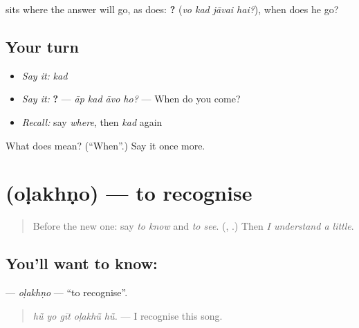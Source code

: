 \begin{grammarlens}[title={What you've built}]
\textbf{} sits where the answer will go, as \textbf{} does: \textbf{   ?} (\emph{vo kad jāvai hai?}), when does he go?
\end{grammarlens}

\subsection*{Your turn}
\begin{itemize}
\raggedright
  \item \emph{Say it:} \emph{kad}
  \item \emph{Say it:} \textbf{   ?} — \emph{āp kad āvo ho?} — When do you come?
  \item \emph{Recall:} say \emph{where}, then \emph{kad} again
\end{itemize}

\begin{tcolorbox}[breakable,colback=teal!4,colframe=teal!35!black,title={Before you move on}]
What does \textbf{} mean? (\textquotedblleft{}When\textquotedblright{}.) Say it once more.
\end{tcolorbox}
\section[\texorpdfstring{\mw{ओळखणो} (oḷakhṇo)}{ओळखणो (oḷakhṇo)}]{ (oḷakhṇo) — to recognise}

\label{lesson:MW-C158-olakhno}



\begin{quote}
Before the new one: say \emph{to know} and \emph{to see}. (\textbf{}, \textbf{}.) Then \emph{I understand a little}.
\end{quote}

\subsection*{You'll want to know: }
\textbf{} — \emph{oḷakhṇo} — \textquotedblleft{}to recognise\textquotedblright{}.

\begin{quote}
\textbf{    }
\end{quote}

\begin{quote}
\emph{hū̃ yo gīt oḷakhū̃ hū̃.} — I recognise this song.
\end{quote}

